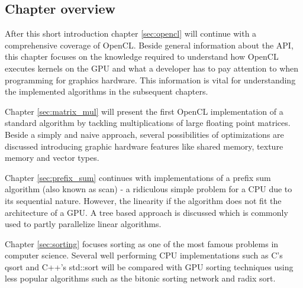 \subsection{Chapter overview}

After this short introduction chapter \ref{sec:opencl} will continue with a comprehensive coverage of OpenCL. Beside general information about the API, this chapter focuses on the knowledge required to understand how OpenCL executes kernels on the GPU and what a developer has to pay attention to when programming for graphics hardware. This information is vital for understanding the implemented algorithms in the subsequent chapters.

Chapter \ref{sec:matrix_mul} will present the first OpenCL implementation of a standard algorithm by tackling multiplications of large floating point matrices. Beside a simply and naive approach, several possibilities of optimizations are discussed introducing graphic hardware features like shared memory, texture memory and vector types.

\pagebreak

Chapter \ref{sec:prefix_sum} continues with implementations of a prefix sum algorithm (also known as scan) - a ridiculous simple problem for a CPU due to its sequential nature. However, the linearity if the algorithm does not fit the architecture of a GPU. A tree based approach is discussed which is commonly used to partly parallelize linear algorithms.

Chapter \ref{sec:sorting} focuses sorting as one of the most famous problems in computer science. Several well performing CPU implementations such as C's qsort and C++'s std::sort will be compared with GPU sorting techniques using less popular algorithms such as the bitonic sorting network and radix sort.
